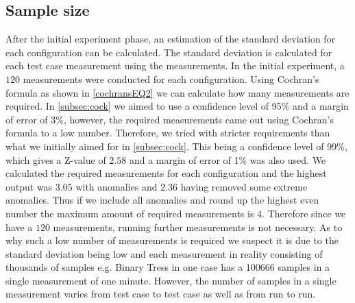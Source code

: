 \subsection{Sample size}
After the initial experiment phase, an estimation of the standard deviation for each configuration can be calculated. The standard deviation is calculated for each test case measurement using the measurements. In the initial experiment, a $120$ measurements were conducted for each configuration. Using Cochran's formula as shown in \cref{cochransEQ2} we can calculate how many measurements are required. In \cref{subsec:cock} we aimed to use a confidence level of 95\% and a margin of error of 3\%, however, the required measurements came out using Cochran's formula to a low number. Therefore, we tried with stricter requirements than what we initially aimed for in \cref{subsec:cock}. This being a confidence level of 99\%, which gives a Z-value of $2.58$ and a margin of error of 1\% was also used. We calculated the required measurements for each configuration and the highest output was $3.05$ with anomalies and $2.36$ having removed some extreme anomalies. Thus if we include all anomalies and round up the highest even number the maximum amount of required measurements is $4$. Therefore since we have a $120$ measurements, running further measurements is not necessary. As to why such a low number of measurements is required we suspect it is due to the standard deviation being low and each measurement in reality consisting of thousands of samples e.g. Binary Tress in one case has a 100666 samples in a single measurement of one minute. However, the number of samples in a single measurement varies from test case to test case as well as from run to run.

